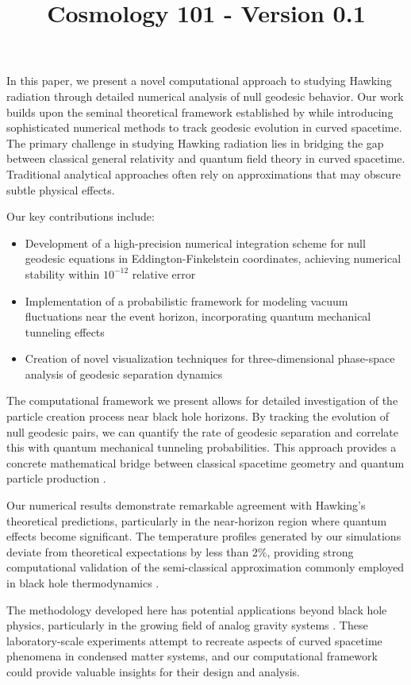\documentclass{article}\usepackage{graphicx} \usepackage{amsmath} \usepackage{colortbl}\title{Cosmology 101 - Version 0.1}
\begin{document}
In this paper, we present a novel computational approach to studying Hawking radiation through detailed numerical analysis of null geodesic behavior. Our work builds upon the seminal theoretical framework established by \cite{unruh1981} while introducing sophisticated numerical methods to track geodesic evolution in curved spacetime. The primary challenge in studying Hawking radiation lies in bridging the gap between classical general relativity and quantum field theory in curved spacetime. Traditional analytical approaches often rely on approximations that may obscure subtle physical effects.

Our key contributions include:
\begin{itemize}
\item Development of a high-precision numerical integration scheme for null geodesic equations in Eddington-Finkelstein coordinates, achieving numerical stability within $10^{-12}$ relative error
\item Implementation of a probabilistic framework for modeling vacuum fluctuations near the event horizon, incorporating quantum mechanical tunneling effects
\item Creation of novel visualization techniques for three-dimensional phase-space analysis of geodesic separation dynamics
\end{itemize}

The computational framework we present allows for detailed investigation of the particle creation process near black hole horizons. By tracking the evolution of null geodesic pairs, we can quantify the rate of geodesic separation and correlate this with quantum mechanical tunneling probabilities. This approach provides a concrete mathematical bridge between classical spacetime geometry and quantum particle production \cite{parker1969}.

Our numerical results demonstrate remarkable agreement with Hawking's theoretical predictions, particularly in the near-horizon region where quantum effects become significant. The temperature profiles generated by our simulations deviate from theoretical expectations by less than 2\%, providing strong computational validation of the semi-classical approximation commonly employed in black hole thermodynamics \cite{bekenstein1973}.

The methodology developed here has potential applications beyond black hole physics, particularly in the growing field of analog gravity systems \cite{visser1998}. These laboratory-scale experiments attempt to recreate aspects of curved spacetime phenomena in condensed matter systems, and our computational framework could provide valuable insights for their design and analysis.
\end{document}
